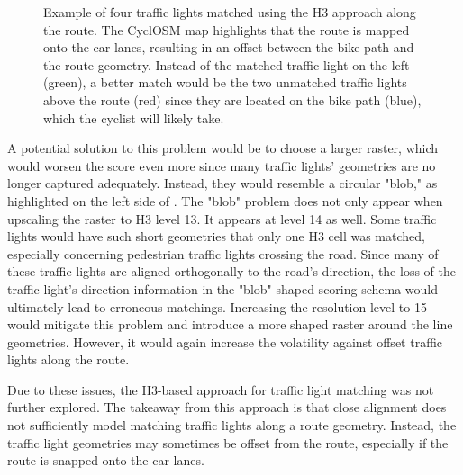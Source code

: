 \begin{figure}[t]
\centering
{}
\caption{Example of four traffic lights matched using the H3 approach along the route. The CyclOSM map highlights that the route is mapped onto the car lanes, resulting in an offset between the bike path and the route geometry. Instead of the matched traffic light on the left (green), a better match would be the two unmatched traffic lights above the route (red) since they are located on the bike path (blue), which the cyclist will likely take.}
\label{fig:sg-selection-h3-example}
\end{figure}

A potential solution to this problem would be to choose a larger raster, which would worsen the score even more since many traffic lights' geometries are no longer captured adequately. Instead, they would resemble a circular "blob," as highlighted on the left side of . The "blob" problem does not only appear when upscaling the raster to H3 level 13. It appears at level 14 as well. Some traffic lights would have such short geometries that only one H3 cell was matched, especially concerning pedestrian traffic lights crossing the road. Since many of these traffic lights are aligned orthogonally to the road's direction, the loss of the traffic light's direction information in the "blob"-shaped scoring schema would ultimately lead to erroneous matchings. Increasing the resolution level to 15 would mitigate this problem and introduce a more shaped raster around the line geometries. However, it would again increase the volatility against offset traffic lights along the route.

Due to these issues, the H3-based approach for traffic light matching was not further explored. The takeaway from this approach is that close alignment does not sufficiently model matching traffic lights along a route geometry. Instead, the traffic light geometries may sometimes be offset from the route, especially if the route is snapped onto the car lanes.

